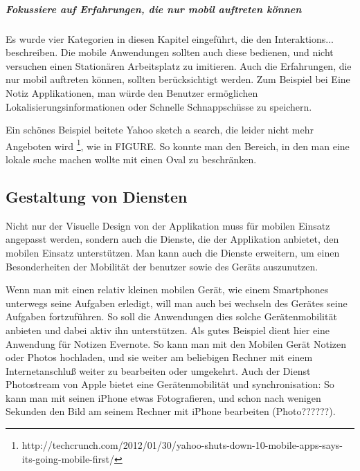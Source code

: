 

\subparagraph{Fokussiere auf Erfahrungen, die nur mobil auftreten können} %
\label{subp:fokussiere_auf_erfahrungen_die_nur_mobil_auftreten_k_nnen}

Es wurde vier Kategorien in diesen Kapitel eingeführt, die den Interaktions... beschreiben. Die mobile Anwendungen sollten auch diese bedienen, und nicht versuchen einen Stationären Arbeitsplatz zu imitieren. Auch die Erfahrungen, die nur mobil auftreten können, sollten berücksichtigt werden. Zum Beispiel bei Eine Notiz Applikationen, man würde den Benutzer ermöglichen Lokalisierungsinformationen oder Schnelle Schnappschüsse zu speichern. 

Ein schönes Beispiel beitete Yahoo sketch a search, die leider nicht mehr Angeboten wird \footnote{http://techcrunch.com/2012/01/30/yahoo-shuts-down-10-mobile-apps-says-its-going-mobile-first/ }, wie in FIGURE. So konnte man den Bereich, in den man eine lokale suche machen wollte mit einen Oval zu beschränken.


\subsection{Gestaltung von Diensten}
\label{sub:gestaltung_von_diensten}

Nicht nur der Visuelle Design von der Applikation muss für mobilen Einsatz angepasst werden, sondern auch die Dienste, die der Applikation anbietet, den mobilen Einsatz unterstützen. Man kann auch die Dienste erweitern, um einen Besonderheiten der Mobilität der benutzer sowie des Geräts auszunutzen.

Wenn man mit einen relativ kleinen mobilen Gerät, wie einem Smartphones unterwegs seine Aufgaben erledigt, will man auch bei wechseln des Gerätes seine Aufgaben fortzuführen. So soll die Anwendungen dies solche Gerätenmobilität anbieten und dabei aktiv ihn unterstützen. Als gutes Beispiel dient hier eine Anwendung für Notizen Evernote. So kann man mit den Mobilen Gerät Notizen oder Photos hochladen, und sie weiter am beliebigen Rechner mit einem Internetanschluß weiter zu bearbeiten oder umgekehrt. Auch der Dienst Photostream von Apple bietet eine Gerätenmobilität und synchronisation: So kann man mit seinen iPhone etwas Fotografieren, und schon nach wenigen Sekunden den Bild am seinem Rechner mit iPhone bearbeiten (Photo??????). 



